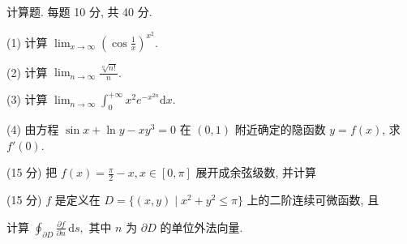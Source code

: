\par{}
计算题. 每题 10 分, 共 40 分.\par
(1) 计算 $\lim_{x\to \infty}\left(\cos \frac{1}{x}\right)^{x^2}.$\par
(2) 计算 $\lim_{n\to \infty}\frac{\sqrt[n]{n!}}{n}$.\par
(3) 计算 $\lim_{n\to \infty}\int_0^{+\infty}x^2 e^{-x^{2n}}\mathrm{d}x.$\par
(4) 由方程 $\sin x + \ln y - xy^3 = 0$ 在 $(0,1)$ 附近确定的隐函数 $y = f(x)$, 求 $f'(0)$.\par
\par{}
\par{}
(15 分) 把 $f(x) = \frac{\pi}{2} - x, x \in [0, \pi]$ 展开成余弦级数, 并计算\par
\nopagebreak[4]
\par{}
\par{}
(15 分) $f$ 是定义在 $D = \{(x, y) \mid x^2 + y^2 \leq \pi\}$ 上的二阶连续可微函数, 且\par
\nopagebreak[4]
计算 $\oint_{\partial D} \frac{\partial f}{\partial n} \, \mathrm{d}s,$ 其中 $n$ 为 $\partial D$ 的单位外法向量.\par
\par{}
\par{}
